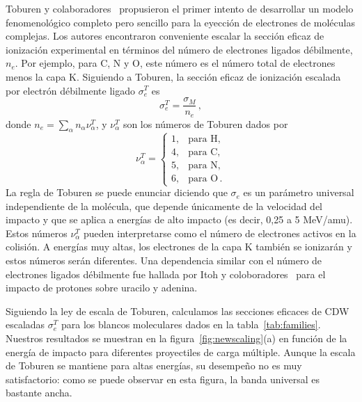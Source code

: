 Toburen y colaboradores~\cite{toburen1975,toburen1976} propusieron el 
primer intento de desarrollar un modelo fenomenológico completo pero 
sencillo para la eyección de electrones de moléculas complejas. Los 
autores encontraron conveniente escalar la sección eficaz de ionización 
experimental en términos del número de electrones ligados débilmente, $n_e$.
Por ejemplo, para C, N y O, este número es el número total de 
electrones menos la capa K. Siguiendo a Toburen, la sección eficaz de 
ionización escalada por electrón débilmente ligado $\sigma_{e}^T$ es
\begin{equation}
\sigma_{e}^T=\frac{\sigma_{M}}{n_e}\,, 
\label{27} 
\end{equation}
donde $n_e=\sum_{\alpha}n_{\alpha}\nu_{\alpha}^T$, y $\nu_{\alpha}^T$ 
son los números de Toburen dados por
\begin{equation}
\nu_{\alpha}^T=\left\{ 
\begin{array}{ll}
1, & \text{para H,} \\
4, & \text{para C,} \\ 
5, & \text{para N,} \\ 
6, & \text{para O}\,.
\end{array}\right.
\label{eq:nelec} 
\end{equation} 
La regla de Toburen se puede enunciar diciendo que $\sigma_{e}$ es un 
parámetro universal independiente de la molécula, que depende únicamente 
de la velocidad del impacto y que se aplica a energías de alto impacto 
(es decir, 0,25 a 5 MeV/amu). Estos números $\nu_{\alpha}^T$ pueden 
interpretarse como el número de electrones activos en la colisión. A 
energías muy altas, los electrones de la capa K también se ionizarán y 
estos números serán diferentes. Una dependencia similar con el número de 
electrones ligados débilmente fue hallada por Itoh y 
coloboradores~\cite{itoh2013} para el impacto de protones sobre uracilo 
y adenina.

Siguiendo la ley de escala de Toburen, calculamos las secciones eficaces 
de CDW escaladas $\sigma_{e}^T$ para los blancos moleculares dados en la
tabla~\ref{tab:families}. Nuestros resultados se muestran en la 
figura~\ref{fig:newscaling}(a) en función de la energía de impacto para 
diferentes proyectiles de carga múltiple. Aunque la escala de Toburen 
se mantiene para altas energías, su desempeño no es muy satisfactorio: 
como se puede observar en esta figura, la banda universal es bastante 
ancha.


